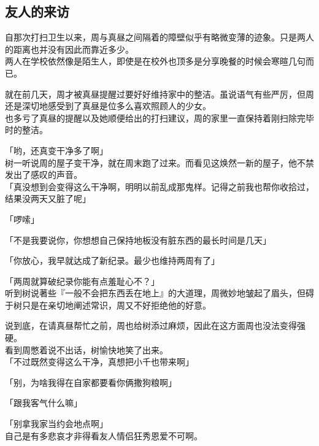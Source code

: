 \subsection{友人的来访}

自那次打扫卫生以来，周与真昼之间隔着的障壁似乎有略微变薄的迹象。只是两人的距离也并没有因此而靠近多少。\\

两人在学校依然像是陌生人，即使是在校外也顶多是分享晚餐的时候会寒暄几句而已。

就在前几天，周才被真昼提醒过要好好维持家中的整洁。虽说语气有些严厉，但周还是深切地感受到了真昼是位多么喜欢照顾人的少女。\\

也多亏了真昼的提醒以及她顺便给出的打扫建议，周的家里一直保持着刚扫除完毕时的整洁。\\

\vspace{2\baselineskip}

「哟，还真变干净多了啊」\\

树一听说周的屋子变干净，就在周末跑了过来。而看见这焕然一新的屋子，他不禁发出了感叹的声音。\\

「真没想到会变得这么干净啊，明明以前乱成那鬼样。记得之前我也帮你收拾过，结果没两天又脏了呢」

「啰嗦」

「不是我要说你，你想想自己保持地板没有脏东西的最长时间是几天」

「你放心，我早就达成了新纪录。最少也维持两周有了」

「两周就算破纪录你能有点羞耻心不？」\\

听到树说著些『一般不会把东西丢在地上』的大道理，周微妙地皱起了眉头，但碍于树只是在亲切地阐述常识，周又不好拒绝他的好意。

说到底，在请真昼帮忙之前，周也给树添过麻烦，因此在这方面周也没法变得强硬。\\

看到周憋着说不出话，树愉快地笑了出来。\\%

「不过既然变得这么干净，真想把小千也带来啊」

「别，为啥我得在自家都要看你俩撒狗粮啊」

「跟我客气什么嘛」

「别拿我家当约会地点啊」\\

自己是有多悲哀才非得看友人情侣狂秀恩爱不可啊。

